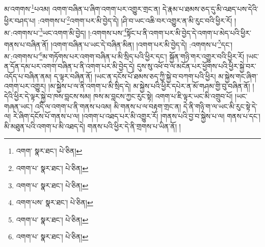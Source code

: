 མ་འགགས་\footnote{འགག་  སྣར་ཐང་།  པེ་ཅིན། }པའམ། འགག་བཞིན་པ་ཞིག་འགག་པར་འགྱུར་གྲང་ན། དེ་རྣམ་པ་ཐམས་ཅད་དུ་མི་འཐད་པས་དེའི་ཕྱིར་བཤད་པ། :འགགས་པ་\footnote{འགག་པ་  སྣར་ཐང་།  པེ་ཅིན། }འགག་པར་མི་བྱེད་དེ། །ཤི་བ་ཡང་འཆི་བར་འགྱུར་ན་མི་རུང་བའི་ཕྱིར་རོ། །མ་:འགགས་པ་\footnote{འགག་པ་  སྣར་ཐང་།  པེ་ཅིན། }ཡང་འགག་མི་བྱེད། །:འགགས་པས་\footnote{འགག་པས་  སྣར་ཐང་།  པེ་ཅིན། }སྟོང་པ་ནི་འགག་པར་མི་བྱེད་དེ་འགག་པ་མེད་པའི་ཕྱིར་གནས་པ་བཞིན་ནོ། །འགག་བཞིན་པ་ཡང་དེ་བཞིན་མིན། །འགག་པར་མི་བྱེད་དེ། :འགགས་པ་\footnote{འགག་པ་  སྣར་ཐང་།  པེ་ཅིན། }དང་། མ་:འགགས་པ་\footnote{འགག་པ་  སྣར་ཐང་།  པེ་ཅིན། }མ་གཏོགས་པར་འགག་བཞིན་པ་མི་སྲིད་པའི་ཕྱིར་དང་། སྐྱོན་གཉི་གར་འགྱུར་བའི་ཕྱིར་རོ། །ཡང་ན་དོན་དམ་པར་འགག་བཞིན་པ་ནི་འགག་པར་མི་བྱེད་དེ། དུས་སུ་འཕོ་བ་ལ་མངོན་པར་ཕྱོགས་པའི་ཕྱིར་སྐྱེ་བར་འདོད་པ་བཞིན་ནམ། ད་ལྟར་བཞིན་ནོ། །ཡང་ན་དངོས་པོ་ཐམས་ཅད་ཀྱི་སྐྱེ་བ་བཀག་པའི་ཕྱིར། མ་སྐྱེས་གང་ཞིག་འགག་པར་འགྱུར། །མ་སྐྱེས་པ་ལ་ནི་འགག་པ་མི་སྲིད་དེ། མ་སྐྱེས་པའི་ཕྱིར་དཔེར་ན་མོ་གཤམ་གྱི་བུ་བཞིན་ནོ། །དེའི་ཕྱིར་དེ་ལྟར་སྐྱེ་བ་ཁས་བླངས་སམ། ཁས་མ་བླངས་ཀྱང་རུང་སྟེ། འགག་པ་ཇི་ལྟར་ཡང་མི་འགྲུབ་པོ། །ཡང་གཞན་ཡང་། འདི་ལ་འགག་པ་ནི་གནས་པའམ། མི་གནས་པ་ལ་བརྟག་གྲང་ན། དེ་ནི་གཉི་ག་ལ་ཡང་མི་རུང་སྟེ་དེ་ལ། རེ་ཞིག་དངོས་པོ་གནས་པ་ལ། །འགག་པ་འཐད་པར་མི་འགྱུར་རོ། །གནས་པའི་བྱ་བ་སྐྱེས་པ་ལ། གནས་པ་དང་། མི་མཐུན་པའི་འགག་པ་མི་འཐད་དེ། གནས་པའི་ཕྱིར་དེ་ནི་གྲགས་པ་ཡིན་ནོ། །
